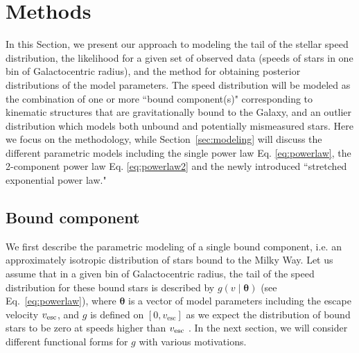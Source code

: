 \section{Methods} \label{sec:methods}
In this Section, we present our approach to modeling the tail of the stellar speed distribution, the likelihood for a given set of observed data (speeds of stars in one bin of Galactocentric radius), and the method for obtaining posterior distributions of the model parameters.  The speed distribution will be modeled as the combination of one or more ``bound component(s)" corresponding to kinematic structures that are gravitationally bound to the Galaxy, and an outlier distribution which models both unbound and potentially mismeasured stars. Here we focus on the methodology, while Section~\ref{sec:modeling} will discuss the different parametric models including the single power law Eq. \ref{eq:powerlaw}, the 2-component power law  Eq. \ref{eq:powerlaw2} and the newly introduced ``stretched exponential power law."

\subsection{Bound component}
We first describe the parametric modeling of a single bound component, i.e. an approximately isotropic distribution of stars bound to the Milky Way. 
Let us assume that in a given bin of Galactocentric radius, the tail of the speed distribution for these bound stars is described by $g(v \mid \mathbf{\theta})$ (see Eq.~\ref{eq:powerlaw}), where $\mathbf{\theta}$ is a vector of model parameters including the escape velocity $v_{\rm{esc}}$, and $g$ is defined on $[0,v_{\mathrm{esc}}]$ as we expect the distribution of bound stars to be zero at speeds higher than $v_{\rm{esc}}$ \citep{Leonard1990}. In the next section, we will consider different functional forms for $g$ with various motivations. 

